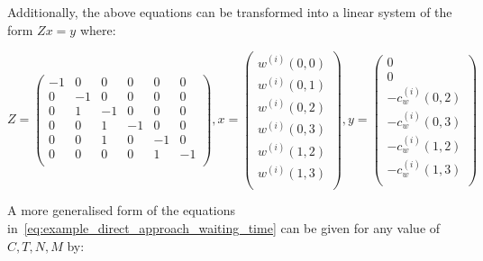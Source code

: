 \vspace{0.5cm}

Additionally, the above equations can be transformed into a linear system of
the form \(Zx=y\) where:

\begin{equation}\label{eq:example_direct_approach_waiting_time}
    Z=
    \begin{pmatrix}
       -1 &  0 &  0 &  0 &  0 &  0 \\  %
        0 & -1 &  0 &  0 &  0 &  0 \\  %
        0 &  1 & -1 &  0 &  0 &  0 \\  %
        0 &  0 &  1 & -1 &  0 &  0 \\  %
        0 &  0 &  1 &  0 & -1 &  0 \\  %
        0 &  0 &  0 &  0 &  1 & -1 \\  %
    \end{pmatrix},
    x=
    \begin{pmatrix}
        w^{(i)}(0,0) \\
        w^{(i)}(0,1) \\
        w^{(i)}(0,2) \\
        w^{(i)}(0,3) \\
        w^{(i)}(1,2) \\
        w^{(i)}(1,3) \\
    \end{pmatrix},
    y=
    \begin{pmatrix}
        0 \\
        0 \\
        -c^{(i)}_w(0,2) \\
        -c^{(i)}_w(0,3) \\
        -c^{(i)}_w(1,2) \\
        -c^{(i)}_w(1,3) \\
    \end{pmatrix}
\end{equation}

A more generalised form of the equations
in~\eqref{eq:example_direct_approach_waiting_time} can be given for any value of
\(C,T,N,M\) by:

